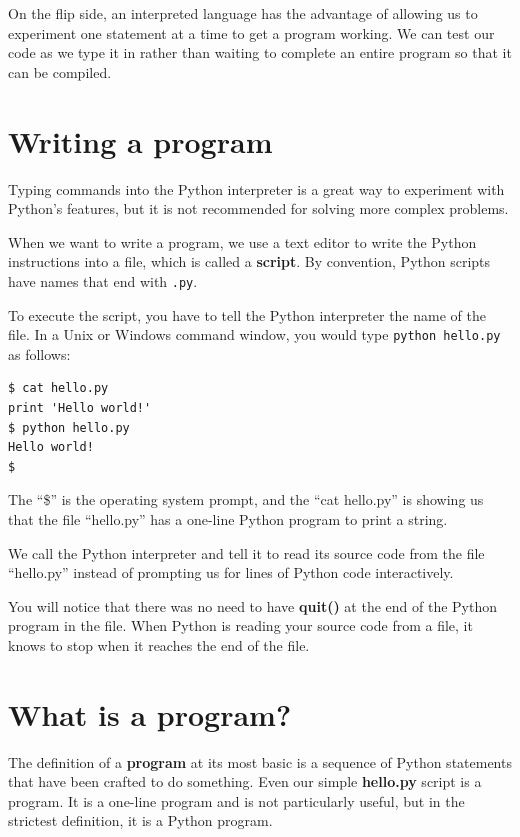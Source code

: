 On the flip side, an interpreted language has the advantage of allowing us to experiment one statement at a time to get a program working. We can test our code as we type it in rather than waiting to complete an entire program so that it can be compiled.


\section{Writing a program}

Typing commands into the Python interpreter is a great way to experiment 
with Python's features, but it is not recommended for solving more complex problems.

When we want to write a program, 
we use a text editor to write the Python instructions into a file,
which is called a {\bf script}.  By
convention, Python scripts have names that end with {\tt .py}.


To execute the script, you have to tell the Python interpreter 
the name of the file.  In a Unix or Windows command window, 
you would type {\tt python hello.py} as follows:

\beforeverb
\begin{verbatim}
$ cat hello.py
print 'Hello world!'
$ python hello.py
Hello world!
$
\end{verbatim}
\afterverb
%
The ``\$'' is the operating system prompt, and the ``cat hello.py'' is 
showing us that the file ``hello.py'' has a one-line Python program to print
a string.

We call the Python interpreter and tell it to read its source code from
the file ``hello.py'' instead of prompting us for lines of Python code
interactively.

You will notice that there was no need to have {\bf quit()} at the end of
the Python program in the file.   When Python is reading your source code
from a file, it knows to stop when it reaches the end of the file.

\section{What is a program?}

The definition of a {\bf program} at its most basic is a sequence
of Python statements that have been crafted to do something.
Even our simple {\bf hello.py} script is a program.  It is a one-line
program and is not particularly useful, but in the strictest definition,
it is a Python program.

